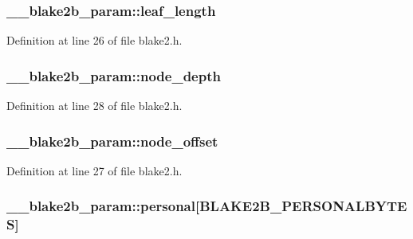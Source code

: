 \subsubsection[{leaf\+\_\+length}]{ \+\_\+\+\_\+blake2b\+\_\+param\+::leaf\+\_\+length}\label{struct____blake2b__param_a960e7c6fed53742f78acd3b6bcb93c71}


Definition at line 26 of file blake2.\+h.

\hypertarget{struct____blake2b__param_aa1b2a90e439a538f609032d3bf852751}{}
\subsubsection[{node\+\_\+depth}]{ \+\_\+\+\_\+blake2b\+\_\+param\+::node\+\_\+depth}\label{struct____blake2b__param_aa1b2a90e439a538f609032d3bf852751}


Definition at line 28 of file blake2.\+h.

\hypertarget{struct____blake2b__param_ada6a88bf4b6f3e08132df538e6c63285}{}
\subsubsection[{node\+\_\+offset}]{ \+\_\+\+\_\+blake2b\+\_\+param\+::node\+\_\+offset}\label{struct____blake2b__param_ada6a88bf4b6f3e08132df538e6c63285}


Definition at line 27 of file blake2.\+h.

\hypertarget{struct____blake2b__param_af8ec1991e3458f8c8cddb70fd0ee7ce5}{}
\subsubsection[{personal}]{ \+\_\+\+\_\+blake2b\+\_\+param\+::personal\mbox{[}{\bf B\+L\+A\+K\+E2\+B\+\_\+\+P\+E\+R\+S\+O\+N\+A\+L\+B\+Y\+T\+E\+S}\mbox{]}}\label{struct____blake2b__param_af8ec1991e3458f8c8cddb70fd0ee7ce5}


